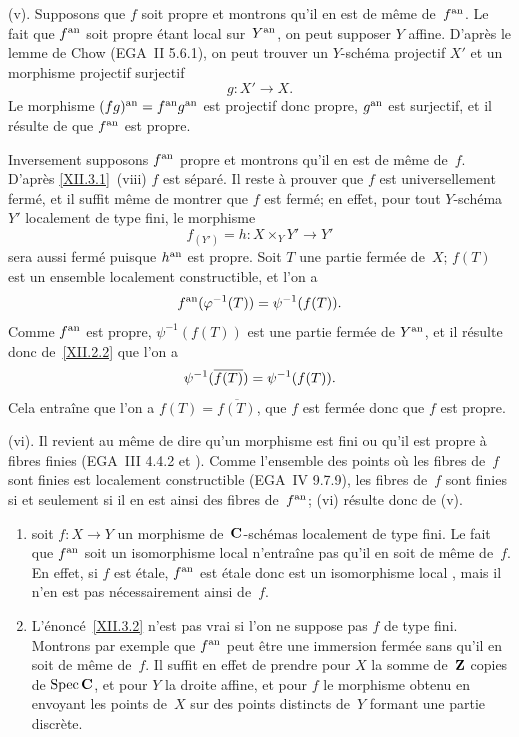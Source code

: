 (v). Supposons que $f$ soit propre et montrons qu'il en est de
m\^eme de~$f^{\mathrm{an}}$. Le fait que $f^{\mathrm{an}} $ soit propre \'etant local
sur~$Y^{\mathrm{an}}$, on peut supposer $Y$ affine. D'apr\`es le lemme de Chow
(EGA~II 5.6.1), on peut trouver un $Y$-sch\'ema projectif $X'$ et un
morphisme projectif surjectif
$$
g \colon X' \to X.
$$
Le morphisme $(fg)^{\mathrm{an}} = f^{\mathrm{an}} g^{\mathrm{an}} $ est projectif donc propre,
$g^{\mathrm{an}} $ est surjectif, et il r\'esulte de \cite[ch.\, 1 \S 10]{XII.1} que
$f^{\mathrm{an}} $ est propre.

Inversement supposons $f^{\mathrm{an}} $ propre et montrons qu'il en est de
m\^eme de~$f$. D'apr\`es \ref{XII.3.1}~(viii) $f$ est
s\'epar\'e. Il reste \`a prouver que $f$ est universellement
ferm\'e, et il suffit m\^eme de montrer que $f$ est ferm\'e; en
effet, pour tout $Y$-sch\'ema $Y'$ localement de type fini, le
morphisme
$$
f_{(Y')} = h \colon X \times_Y Y' \to Y'
$$
sera aussi ferm\'e puisque $h^{\mathrm{an}} $ est propre. Soit $T$ une partie
ferm\'ee de~$X$; $f(T)$ est un ensemble localement constructible, et
l'on a
$$
f^{\mathrm{an}} (\varphi^{-1} (T)) = \psi^{-1} (f(T)).
$$
Comme
$f^{\mathrm{an}} $ est propre, $\psi^{-1} (f (T))$ est une partie ferm\'ee de
$Y^{\mathrm{an}} $, et il r\'esulte donc de~\ref{XII.2.2} que l'on a
$$
\psi^{-1} (\overline{f(T)}) = \psi^{-1} (f(T)) .
$$
Cela entra\^ine que l'on a $f(T) = \overline{f(T)}$, \ie que $f$
est ferm\'ee donc que $f$ est propre.

(vi). Il revient au m\^eme de dire qu'un morphisme est fini ou qu'il
est propre \`a fibres finies (EGA~III 4.4.2 et \cite[ \S 5]{XII.4}).
Comme l'ensemble des points o\`u les fibres de~$f$ sont finies est
localement constructible (EGA~IV 9.7.9), les fibres de~$f$ sont finies
si et seulement si il en est ainsi des fibres de~$f^{\mathrm{an}} $; (vi)
r\'esulte donc de (v).

\begin{remarque}
\label{XII.3.3}
\begin{enumerate}
\item[a)] soit $f \colon X \to Y$ un morphisme de~$\mathbf{C}$-sch\'emas
localement de type fini. Le fait que $f^{\mathrm{an}} $ soit un isomorphisme
local n'entra\^ine pas qu'il en soit de m\^eme de~$f$. En effet,
si $f$ est \'etale, $f^{\mathrm{an}} $ est \'etale donc est un isomorphisme
local \hbox{\cite[ \S 1]{XII.4}}, mais il n'en est pas n\'ecessairement ainsi
de~$f$.
\item[b)]
L'\'enonc\'e~\ref{XII.3.2}
n'est pas vrai si l'on ne suppose
pas $f$ de type fini. Montrons par exemple que $f^{\mathrm{an}} $ peut \^etre
une immersion ferm\'ee sans qu'il en soit de m\^eme de~$f$. Il
suffit en effet de prendre pour $X$ la somme de~$\mathbf{Z} $ copies de
$\operatorname{Spec} \mathbf{C}$, et pour $Y$ la droite affine, et pour $f$ le morphisme
obtenu en envoyant les points de~$X$ sur des points distincts de~$Y$
formant une partie discr\`ete.
\end{enumerate}
\end{remarque}

